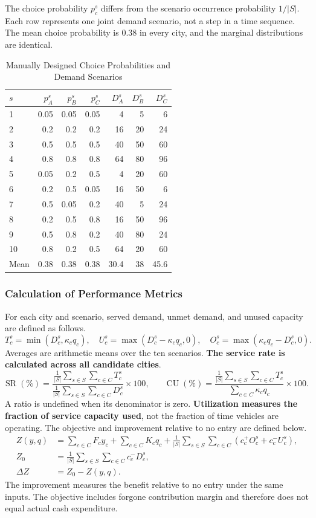 \documentclass[10pt,a4paper]{article}
\begin{document}
The choice probability $p_c^s$ differs from the scenario occurrence probability $1/|S|$. Each row represents one joint demand scenario, not a step in a time sequence. The mean choice probability is $0.38$ in every city, and the marginal distributions are identical.
\begin{table}[H]
\centering\small
\caption{Manually Designed Choice Probabilities and Demand Scenarios}\label{tab:sc-scenarios}
\begin{tabular}{lrrrrrr}
\toprule
$s$ & $p_A^s$ & $p_B^s$ & $p_C^s$ & $D_A^s$ & $D_B^s$ & $D_C^s$\\\midrule
1 & 0.05 & 0.05 & 0.05 & 4 & 5 & 6\\
2 & 0.2 & 0.2 & 0.2 & 16 & 20 & 24\\
3 & 0.5 & 0.5 & 0.5 & 40 & 50 & 60\\
4 & 0.8 & 0.8 & 0.8 & 64 & 80 & 96\\
5 & 0.05 & 0.2 & 0.5 & 4 & 20 & 60\\
6 & 0.2 & 0.5 & 0.05 & 16 & 50 & 6\\
7 & 0.5 & 0.05 & 0.2 & 40 & 5 & 24\\
8 & 0.2 & 0.5 & 0.8 & 16 & 50 & 96\\
9 & 0.5 & 0.8 & 0.2 & 40 & 80 & 24\\
10 & 0.8 & 0.2 & 0.5 & 64 & 20 & 60\\
Mean & 0.38 & 0.38 & 0.38 & 30.4 & 38 & 45.6\\
\bottomrule
\end{tabular}
\end{table}

\subsubsection{Calculation of Performance Metrics}
For each city and scenario, served demand, unmet demand, and unused capacity are defined as follows.
\[
T_c^s=\min(D_c^s,\kappa_cq_c),\quad
U_c^s=\max(D_c^s-\kappa_cq_c,0),\quad
O_c^s=\max(\kappa_cq_c-D_c^s,0).
\]
Averages are arithmetic means over the ten scenarios. \textbf{The service rate is calculated across all candidate cities}.
\[
\mathrm{SR}\;(\%)=
\frac{\frac{1}{|S|}\sum_{s\in S}\sum_{c\in C}T_c^s}
{\frac{1}{|S|}\sum_{s\in S}\sum_{c\in C}D_c^s}\times100,
\qquad
\mathrm{CU}\;(\%)=
\frac{\frac{1}{|S|}\sum_{s\in S}\sum_{c\in C}T_c^s}{\sum_{c\in C}\kappa_cq_c}\times100.
\]
A ratio is undefined when its denominator is zero. \textbf{Utilization measures the fraction of service capacity used}, not the fraction of time vehicles are operating. The objective and improvement relative to no entry are defined below.
\begin{align*}
Z(y,q)&=\sum_{c\in C}F_cy_c+\sum_{c\in C}K_cq_c
+\frac{1}{|S|}\sum_{s\in S}\sum_{c\in C}(c_c^+O_c^s+c_c^-U_c^s),\\
Z_0&=\frac{1}{|S|}\sum_{s\in S}\sum_{c\in C}c_c^-D_c^s,\\
\Delta Z&=Z_0-Z(y,q).
\end{align*}
The improvement measures the benefit relative to no entry under the same inputs. The objective includes forgone contribution margin and therefore does not equal actual cash expenditure.
\end{document}
